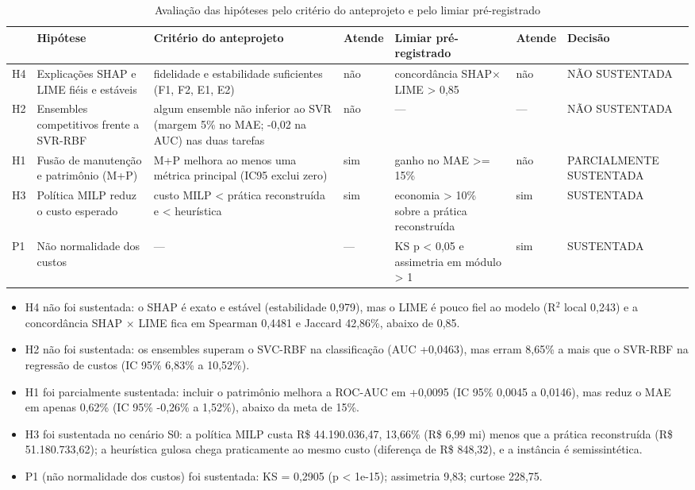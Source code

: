 \begin{table}[H]
\centering\scriptsize
\caption{Avaliação das hipóteses pelo critério do anteprojeto e pelo limiar pré-registrado}
\label{tab:hipoteses}
\begin{tabular}{p{}p{}p{}p{}p{}p{}p{}}
\hline
\textbf{} & \textbf{Hipótese} & \textbf{Critério do anteprojeto} & \textbf{Atende} & \textbf{Limiar pré-registrado} & \textbf{Atende} & \textbf{Decisão} \\ \hline
H4 & Explicações SHAP e LIME fiéis e estáveis & fidelidade e estabilidade suficientes (F1, F2, E1, E2) & não & concordância SHAP$\times$LIME > 0,85 & não & NÃO SUSTENTADA \\
H2 & Ensembles competitivos frente a SVR-RBF & algum ensemble não inferior ao SVR (margem 5\% no MAE; -0,02 na AUC) nas duas tarefas & não & — & — & NÃO SUSTENTADA \\
H1 & Fusão de manutenção e patrimônio (M+P) & M+P melhora ao menos uma métrica principal (IC95 exclui zero) & sim & ganho no MAE >= 15\% & não & PARCIALMENTE SUSTENTADA \\
H3 & Política MILP reduz o custo esperado & custo MILP < prática reconstruída e < heurística & sim & economia > 10\% sobre a prática reconstruída & sim & SUSTENTADA \\
P1 & Não normalidade dos custos & — & — & KS p < 0,05 e assimetria em módulo > 1 & sim & SUSTENTADA \\
\hline
\end{tabular}
\end{table}

\begin{itemize}
  \item H4 não foi sustentada: o SHAP é exato e estável (estabilidade 0,979), mas o LIME é pouco fiel ao modelo (R$^2$ local 0,243) e a concordância SHAP $\times$ LIME fica em Spearman 0,4481 e Jaccard 42,86\%, abaixo de 0,85.
  \item H2 não foi sustentada: os ensembles superam o SVC-RBF na classificação (AUC +0,0463), mas erram 8,65\% a mais que o SVR-RBF na regressão de custos (IC 95\% 6,83\% a 10,52\%).
  \item H1 foi parcialmente sustentada: incluir o patrimônio melhora a ROC-AUC em +0,0095 (IC 95\% 0,0045 a 0,0146), mas reduz o MAE em apenas 0,62\% (IC 95\% -0,26\% a 1,52\%), abaixo da meta de 15\%.
  \item H3 foi sustentada no cenário S0: a política MILP custa R\$ 44.190.036,47, 13,66\% (R\$ 6,99 mi) menos que a prática reconstruída (R\$ 51.180.733,62); a heurística gulosa chega praticamente ao mesmo custo (diferença de R\$ 848,32), e a instância é semissintética.
  \item P1 (não normalidade dos custos) foi sustentada: KS = 0,2905 (p < 1e-15); assimetria 9,83; curtose 228,75.
\end{itemize}